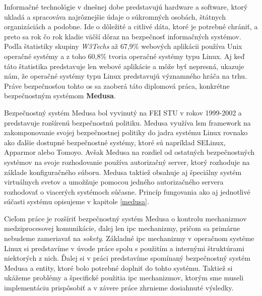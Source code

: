 Informačné technológie v dnešnej dobe predstavujú hardware a software, ktorý ukladá a spracováva najrôznejšie údaje o súkromných osobách, štátnych organizáciách a podobne. Ide o dôležité a citlivé dáta, ktoré je potrebné chrániť, a preto sa rok čo rok kladie väčší dôraz na bezpečnosť informačných systémov. Podľa štatistiky skupiny \textit{W3Techs} až 67,9\% webových aplikácii používa Unix operačné systémy a z toho 60,8\% tvoria operačné systémy typu Linux.\cite{stats} Aj keď táto štatistika predstavuje len webové aplikácie a môže byť nepresná, ukazuje nám, že operačné systémy typu Linux predstavujú významného hráča na trhu. Práve bezpečnosťou tohto \acrshort{os} sa zaoberá táto diplomová práca, konkrétne bezpečnostným systémom \textbf{Medusa}.

Bezpečnostný systém Medusa bol vyvinutý na FEI STU v rokov 1999-2002 a predstavuje rozšírenú bezpečnostnú politiku. Medusa využíva \acrshort{lsm} framework na zakomponovanie svojej bezpečnostnej politiky do jadra systému Linux rovnako ako ďalšie dostupné bezpečnostné systémy, ktoré sú napríklad SELinux, Apparmor alebo Tomoyo. Avšak Medusa na rozdiel od ostatných bezpečnostných systémov na svoje rozhodovanie používa autorizačný server, ktorý rozhoduje na základe konfiguračného súboru. Medusa taktiež obsahuje aj špeciálny systém virtuálnych svetov a umožňuje pomocou jedného autorizačného servera rozhodovať o viacerých systémoch súčasne. Princíp fungovania ako aj jednotlivé súčasti systému opisujeme v kapitole \ref{medusa}.

Cieľom práce je rozšíriť bezpečnostný systém Medusa o kontrolu mechanizmov medziprocesovej komunikácie, ďalej len \acrshort{ipc} mechanizmy, pričom sa primárne nebudeme zameriavať na \textit{sokety}. Základné \acrshort{ipc} mechanizmy v operačnom systéme Linux si predstavíme v úvode práce spolu s použitím a internými štruktúrami niektorých z nich. Ďalej si v práci predstavíme spomínaný bezpečnostný systém Medusa a entity, ktoré bolo potrebné doplniť do tohto systému. Taktiež si ukážeme problémy a špecifické použitia \acrshort{ipc} mechanizmov, ktorým sme museli implementáciu prispôsobiť a v závere práce zhrnieme dosiahnuté výsledky. 